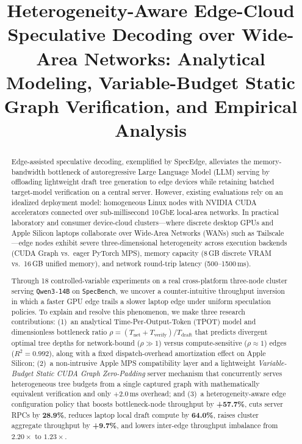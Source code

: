 \documentclass[10pt,conference]{IEEEtran}
\begin{document}
\title{Heterogeneity-Aware Edge-Cloud Speculative Decoding over Wide-Area Networks: Analytical Modeling, Variable-Budget Static Graph Verification, and Empirical Analysis}

\author{%
}

\maketitle

\begin{abstract}
Edge-assisted speculative decoding, exemplified by SpecEdge, alleviates the memory-bandwidth bottleneck of autoregressive Large Language Model (LLM) serving by offloading lightweight draft tree generation to edge devices while retaining batched target-model verification on a central server. However, existing evaluations rely on an idealized deployment model: homogeneous Linux nodes with NVIDIA CUDA accelerators connected over sub-millisecond 10\,GbE local-area networks. In practical laboratory and consumer device-cloud clusters---where discrete desktop GPUs and Apple Silicon laptops collaborate over Wide-Area Networks (WANs) such as Tailscale---edge nodes exhibit severe three-dimensional heterogeneity across execution backends (CUDA Graph vs.\ eager PyTorch MPS), memory capacity (8\,GB discrete VRAM vs.\ 16\,GB unified memory), and network round-trip latency (500--1500\,ms).

Through 18 controlled-variable experiments on a real cross-platform three-node cluster serving \texttt{Qwen3-14B} on \texttt{SpecBench}, we uncover a counter-intuitive throughput inversion in which a faster GPU edge trails a slower laptop edge under uniform speculation policies. To explain and resolve this phenomenon, we make three research contributions: (1)~an analytical Time-Per-Output-Token (TPOT) model and dimensionless bottleneck ratio $\rho = (T_{\mathrm{net}} + T_{\mathrm{verify}}) / T_{\mathrm{draft}}$ that predicts divergent optimal tree depths for network-bound ($\rho \gg 1$) versus compute-sensitive ($\rho \approx 1$) edges ($R^2 = 0.992$), along with a fixed dispatch-overhead amortization effect on Apple Silicon; (2)~a non-intrusive Apple MPS compatibility layer and a lightweight \emph{Variable-Budget Static CUDA Graph Zero-Padding} server mechanism that concurrently serves heterogeneous tree budgets from a single captured graph with mathematically equivalent verification and only $+2.0$\,ms overhead; and (3)~a heterogeneity-aware edge configuration policy that boosts bottleneck-node throughput by \textbf{+57.7\%}, cuts server RPCs by \textbf{28.9\%}, reduces laptop local draft compute by \textbf{64.0\%}, raises cluster aggregate throughput by \textbf{+9.7\%}, and lowers inter-edge throughput imbalance from $2.20\times$ to $1.23\times$.
\end{abstract}
\end{document}
